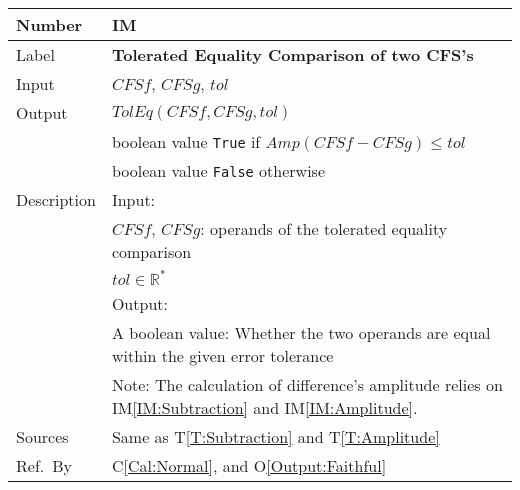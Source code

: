 \documentclass[12pt]{article}
\newcommand{\colAwidth}{0.13\textwidth}
\newcommand{\colBwidth}{0.82\textwidth}
\newcommand{\tref}[1]{T\ref{#1}}
\newcounter{instnum} %
\newcommand{\iref}[1]{IM\ref{#1}}
\newcommand{\calref}[1]{C\ref{#1}}
\newcommand{\oref}[1]{O\ref{#1}}
\begin{document}
\noindent
\begin{minipage}{\textwidth}
	\renewcommand*{\arraystretch}{1.5}
	\begin{tabular}{| p{\colAwidth} | p{\colBwidth}|}
		\hline
		\rowcolor[gray]{0.9}
		Number& IM{instnum}\theinstnum 
		\label{IM:ToleratedEquality}\\
		\hline
		Label& \bf Tolerated Equality Comparison of two CFS's \\
		\hline
		Input& $\mathit{CFSf}$, $\mathit{CFSg}$, $\mathit{tol}$\\
		\hline
		Output&$\mathit{TolEq}(\mathit{CFSf}, \mathit{CFSg}, \mathit{tol})$\\
		& boolean value \texttt{True} if 
		$\mathit{Amp}(\mathit{CFSf}-\mathit{CFSg})\leq \mathit{tol}$\\
		&boolean value \texttt{False} otherwise\\
		\hline
		Description&Input:\\
		&$\mathit{CFSf}$, $\mathit{CFSg}$: operands of 
		the tolerated equality comparison\\
		&$\mathit{tol}\in\mathbb{R}^{*}$\\
		&Output:\\
		& A boolean value: Whether the two operands are equal 
		within the given error tolerance\\
		&Note: The calculation of difference's amplitude 
		relies on \iref{IM:Subtraction} and \iref{IM:Amplitude}.\\
		\hline
		Sources&Same as \tref{T:Subtraction} and \tref{T:Amplitude}\\
		\hline
		Ref.\ By &  \calref{Cal:Normal}, 
		and \oref{Output:Faithful}\\
		\hline
	\end{tabular}
\end{minipage}\\
~\newline
\end{document}
